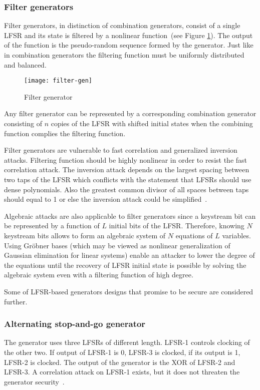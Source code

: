 \subsubsection{Filter generators}
Filter generators, in distinction of combination generators, consist of a single
LFSR and its state is filtered by a nonlinear function~(see Figure
\ref{fig:filter-gen}). The output of the function is the pseudo-random sequence
formed by the generator. Just like in combination generators the filtering
function must be uniformly distributed and balanced.
\begin{figure}[htbp]
    \centering
    \texttt{[image: filter-gen]}
    \caption{Filter generator}
    \label{fig:filter-gen}
\end{figure}

Any filter generator can be represented by a corresponding combination generator
consisting of $n$ copies of the LFSR with shifted initial states when the
combining function complies the filtering function.

Filter generators are vulnerable to fast correlation and generalized inversion
attacks. Filtering function should be highly nonlinear in order to resist the
fast correlation attack. The inversion attack depends on the largest spacing
between two taps of the LFSR which conflicts with the statement that LFSRs
should use dense polynomials. Also the greatest common divisor of all spaces
between taps should equal to 1 or else the inversion attack could be
simplified~\cite{encyclopedia_of_cryptography}. 

Algebraic attacks are also applicable to filter generators since a keystream
bit can be represented by a function of $L$ initial bits of the LFSR. Therefore,
knowing $N$ keystream bits allows to form an algebraic system of $N$ equations
of $L$ variables. Using Gr\"obner bases (which may be viewed as nonlinear
generalization of Gaussian elimination for linear systems) enable an attacker to
lower the degree of the equations until the recovery of LFSR initial state is
possible by solving the algebraic system even with a filtering function of high
degree. 

Some of LFSR-based generators designs that promise to be secure are considered
further.

\subsubsection{Alternating stop-and-go generator}

The generator uses three LFSRs of different length. LFSR-1 controls clocking of
the other two. If output of LFSR-1 is 0, LFSR-3 is clocked, if its output is 1,
LFSR-2 is clocked. The output of the generator is the XOR of LFSR-2 and LFSR-3.
A correlation attack on LFSR-1 exists, but it does not threaten the generator
security~\cite{schneier:applied_cryptography:2}.

